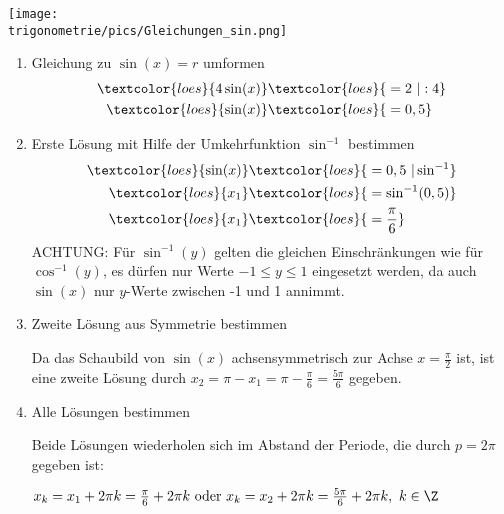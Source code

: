 \bigskip

\begin{minipage}{\textwidth}
	\texttt{[image: \\trigonometrie/pics/Gleichungen\_sin.png]}
\end{minipage}%

\bigskip

\begin{enumerate}
	\item Gleichung zu \(\sin(x)=r\) umformen
	\begin{align*}
		\textcolor{loes}{4\sin(x)}&\textcolor{loes}{\;=2\ \vert :4}\\
		\textcolor{loes}{\sin(x)}&\textcolor{loes}{\;=0,5}
	\end{align*}
	\item Erste Lösung mit Hilfe der Umkehrfunktion \(\sin^{-1}\) bestimmen
	\begin{align*}
		\textcolor{loes}{\sin(x)}&\textcolor{loes}{\;=0,5\ \vert \sin^{-1}}\\
		\textcolor{loes}{x_1}&\textcolor{loes}{\;=\sin^{-1}(0,5)}\\
		\textcolor{loes}{x_1}&\textcolor{loes}{\;=\frac{\pi}{6}}\
	\end{align*}
	\textcolor{loes}{ACHTUNG: Für \(\sin^{-1}(y)\) gelten die gleichen Einschränkungen wie für \(\cos^{-1}(y)\), es dürfen nur Werte \(-1\leq y \leq1\) eingesetzt werden, da auch \(\sin(x)\) nur \(y\)-Werte zwischen -1 und 1 annimmt.}
	\item Zweite Lösung aus Symmetrie bestimmen

	\textcolor{loes}{Da das Schaubild von \(\sin(x)\) achsensymmetrisch zur Achse \(x=\frac{\pi}{2}\) ist, ist eine zweite Lösung durch \(x_2=\pi-x_1=\pi-\frac{\pi}{6}=\frac{5\pi}{6}\) gegeben.}

    \vspace{1cm}

	\item Alle Lösungen bestimmen

	\textcolor{loes}{Beide Lösungen wiederholen sich im Abstand der Periode, die durch \(p=2\pi\) gegeben ist:}

	\textcolor{loes}{\(x_k=x_1+2\pi k=\frac{\pi}{6}+2\pi k\text{ oder } x_k=x_2+2\pi k=\frac{5\pi}{6}+2\pi k,\ k\in \Z\)}
\end{enumerate}

